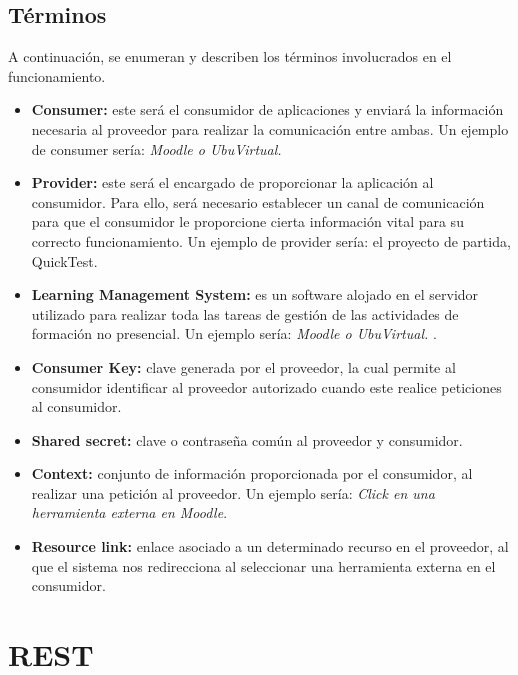 \subsection{Términos}

A continuación, se enumeran y describen los términos involucrados en el funcionamiento.

\begin{itemize}

	\item \textbf{Consumer:} este será el consumidor de aplicaciones y enviará la información necesaria al proveedor para realizar la comunicación entre ambas. Un ejemplo de consumer sería: \emph{Moodle o UbuVirtual.}
	
	\item \textbf{Provider:} este será el encargado de proporcionar la aplicación al consumidor. Para ello, será necesario establecer un canal de comunicación para que el consumidor le proporcione cierta información vital para su correcto funcionamiento. Un ejemplo de provider sería: el proyecto de partida, QuickTest.
	
	\item \textbf{Learning Management System:} es un software alojado en el servidor utilizado para realizar toda las tareas de gestión de las actividades de formación no presencial. Un ejemplo sería: \emph{Moodle o UbuVirtual.} \cite{wiki:lms}.
	
	\item \textbf{Consumer Key:} clave generada por el proveedor, la cual permite al consumidor identificar al proveedor autorizado cuando este realice peticiones al consumidor.
	
	\item \textbf{Shared secret:} clave o contraseña común al proveedor y consumidor.
	
	\item \textbf{Context:} conjunto de información proporcionada por el consumidor, al realizar una petición al proveedor. Un ejemplo sería: \emph{Click en una herramienta externa en Moodle}.
	
	\item \textbf{Resource link:} enlace asociado a un determinado recurso en el proveedor, al que el sistema nos redirecciona al seleccionar una herramienta externa en el consumidor.
	
\end{itemize}


\section{REST}\label{sec:Rest}

